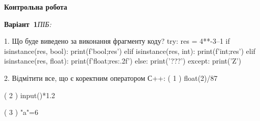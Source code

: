 \documentclass[11pt]{article}
\begin{document}
{\large\textbf{Контрольна робота}}

\textbf{Варіант \No\,1}\hfill \textit{ПІБ:}\,\underline{\hspace{60mm}}
\vspace{4mm}

1. Що буде виведено за виконання фрагменту коду?
try:
    res = 4**-3--1
    if isinstance(res, bool):
        print(f'bool;{res}')
    elif isinstance(res, int):
        print(f'int;{res}')
    elif isinstance(res, float):
        print(f'float;{res:.2f}')
    else:
        print('???')
except:
    print('Z')

2. Відмітити все, що є коректним оператором С++:
( 1 ) float(2)/87

( 2 ) input()*1.2

( 3 ) "a"=6
\end{document}
